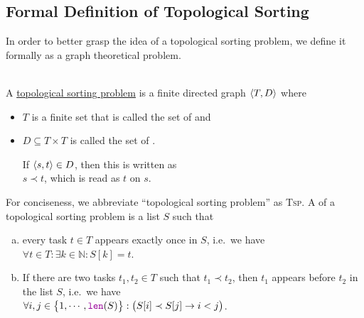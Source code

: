 \subsection{Formal Definition of Topological Sorting}
In order to better grasp the idea of a topological sorting problem, we define it formally as a graph
theoretical problem.
\begin{Definition}  \hspace*{\fill} \\
  A \href{https://en.wikipedia.org/wiki/Topological_sorting}{topological sorting problem} is a finite directed graph
  $\pair(T, D)$ where
  \begin{itemize}
  \item $T$ is a finite set that is called the set of  and 
  \item $D \subseteq T \times T$ is called the set of .

        If $\pair(s, t) \in D$, then this is written as 
        \\[0.2cm]
        \hspace*{1.3cm}
        $s \prec t$, \quad which is read as $t$  on $s$.
  \end{itemize}
  For conciseness, we abbreviate ``topological sorting problem'' as \textsc{Tsp}.
  A  of a topological sorting problem is a list $S$ such that
  \begin{enumerate}[(a)]
  \item every task $t \in T$ appears exactly once in $S$, i.e.~we have
        \\[0.2cm]
        \hspace*{1.3cm}
        $\forall t \in T: \exists k \in \mathbb{N}: S[k] = t$.
\item If there are two tasks $t_1, t_2 \in T$ such that $t_1 \prec t_2$, then $t_1$ appears before $t_2$
        in the list $S$, i.e.~we have
        \\[0.2cm]
        \hspace*{1.3cm}
        $\forall i,j \in \bigl\{1,\cdots,\mytt{len}(S)\bigr\}:\bigl(S[i] \prec S[j] \rightarrow i < j\bigr)$.
        \eox
\end{enumerate}

\end{Definition}

